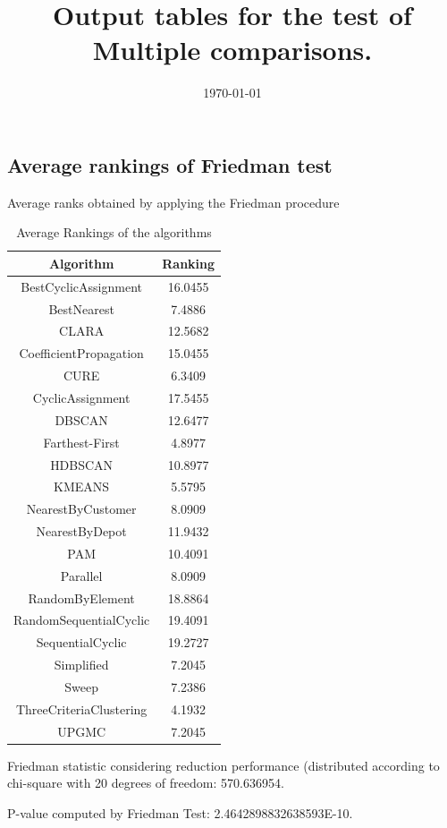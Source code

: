 \documentclass[a4paper,10pt]{article}
\title{Output tables for the test of Multiple comparisons.}
\author{}
\date{\today}
\begin{document}
\begin{landscape}
\pagestyle{empty}
\maketitle
\thispagestyle{empty}
\section{Average rankings of Friedman test}



Average ranks obtained by applying the Friedman procedure

\begin{table}[!htp]
\centering
\begin{tabular}{|c|c|}\hline
Algorithm&Ranking\\\hline
BestCyclicAssignment & 16.0455\\
BestNearest & 7.4886\\
CLARA & 12.5682\\
CoefficientPropagation & 15.0455\\
CURE & 6.3409\\
CyclicAssignment & 17.5455\\
DBSCAN & 12.6477\\
Farthest-First & 4.8977\\
HDBSCAN & 10.8977\\
KMEANS & 5.5795\\
NearestByCustomer & 8.0909\\
NearestByDepot & 11.9432\\
PAM & 10.4091\\
Parallel & 8.0909\\
RandomByElement & 18.8864\\
RandomSequentialCyclic & 19.4091\\
SequentialCyclic & 19.2727\\
Simplified & 7.2045\\
Sweep & 7.2386\\
ThreeCriteriaClustering & 4.1932\\
UPGMC & 7.2045\\
\hline
\end{tabular}
\caption{Average Rankings of the algorithms}
\end{table}

Friedman statistic considering reduction performance (distributed according to chi-square with 20 degrees of freedom: 570.636954.

P-value computed by Friedman Test: 2.4642898832638593E-10.\newline


\end{landscape}
\end{document}
